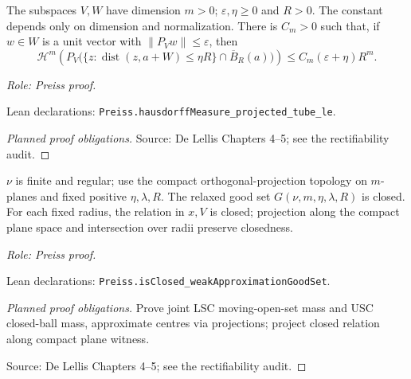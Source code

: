 \begin{lemma}
\label{lem:projected-tube-slab-bound}







The subspaces \(V,W\) have dimension \(m>0\); \(\varepsilon,\eta\geq0\) and \(R>0\). The constant depends only on dimension and normalization.
There is \(C_m>0\) such that, if \(w\in W\) is a unit vector with \(\|P_Vw\|\leq\varepsilon\), then
\[
 \mathcal H^m\!\left(P_V\bigl(\{z:\operatorname{dist}(z,a+W)\leq\eta R\}\cap\overline B_R(a)\bigr)\right)
 \leq C_m(\varepsilon+\eta)R^m.
\]
\par\emph{Role: Preiss proof.}
\par Lean declarations: \texttt{Preiss.hausdorffMeasure\_projected\_tube\_le}.
\end{lemma}
\begin{proof}[Planned proof obligations]

\par Source: De Lellis Chapters 4--5; see the rectifiability audit.
\end{proof}

\begin{lemma}
\label{lem:closed-weak-approximation-good-set}








\(\nu\) is finite and regular; use the compact orthogonal-projection topology on \(m\)-planes and fixed positive \(\eta,\lambda,R\).
The relaxed good set \(G(\nu,m,\eta,\lambda,R)\) is closed.
For each fixed radius, the relation in \(x,V\) is closed; projection along the compact plane space and intersection over radii preserve closedness.
\par\emph{Role: Preiss proof.}
\par Lean declarations: \texttt{Preiss.isClosed\_weakApproximationGoodSet}.
\end{lemma}
\begin{proof}[Planned proof obligations]

Prove joint LSC moving-open-set mass and USC closed-ball mass, approximate centres via projections; project closed relation along compact plane witness.
\par Source: De Lellis Chapters 4--5; see the rectifiability audit.
\end{proof}

